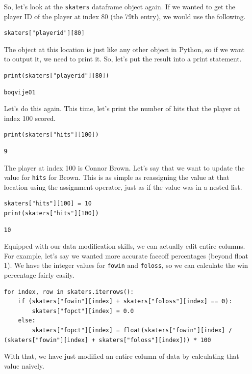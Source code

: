 So, let's look at the \verb|skaters| dataframe object again. If we wanted to get the player ID of the player at index 80 (the 79th entry), we would use the following.
\begin{lstlisting}[style=pippython]
skaters["playerid"][80]
\end{lstlisting}
The object at this location is just like any other object in Python, so if we want to output it, we need to print it. So, let's put the result into a print statement.\par
\begin{lstlisting}[style=pippython]
print(skaters["playerid"][80])
\end{lstlisting}
\begin{lstlisting}[style=none]
boqvije01
\end{lstlisting}
Let's do this again. This time, let's print the number of hits that the player at index 100 scored.
\begin{lstlisting}[style=pippython]
print(skaters["hits"][100])
\end{lstlisting}
\begin{lstlisting}[style=none]
9
\end{lstlisting}
The player at index 100 is Connor Brown. Let's say that we want to update the value for \verb|hits| for Brown. This is as simple as reassigning the value at that location using the assignment operator, just as if the value was in a nested list.\par
\begin{lstlisting}[style=pippython]
skaters["hits"][100] = 10
print(skaters["hits"][100])
\end{lstlisting}
\begin{lstlisting}[style=none]
10
\end{lstlisting}
Equipped with our data modification skills, we can actually edit entire columns. For example, let's say we wanted more accurate faceoff percentages (beyond float 1). We have the integer values for \verb|fowin| and \verb|foloss|, so we can calculate the win percentage fairly easily.\par
\begin{lstlisting}[style=pippython]
for index, row in skaters.iterrows():
	if (skaters["fowin"][index] + skaters["foloss"][index] == 0):
		skaters["fopct"][index] = 0.0
	else:
		skaters["fopct"][index] = float(skaters["fowin"][index] / (skaters["fowin"][index] + skaters["foloss"][index])) * 100
\end{lstlisting}
With that, we have just modified an entire column of data by calculating that value naively.\par
